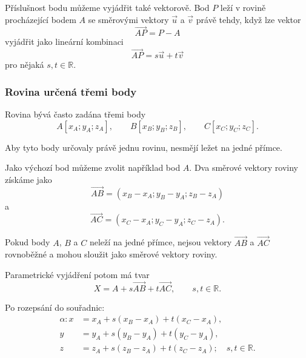 Příslušnost bodu můžeme vyjádřit také vektorově. Bod $P$ leží
v rovině procházející bodem $A$ se směrovými vektory $\vec{u}$
a $\vec{v}$ právě tehdy, když lze vektor
\[
    \overrightarrow{AP}=P-A
\]
vyjádřit jako lineární kombinaci
\[
    \overrightarrow{AP}=s\vec{u}+t\vec{v}
\]
pro nějaká $s,t\in\mathbb{R}$.


\subsubsection{Rovina určená třemi body}
\label{subsubsec:Plane_through_three_points}

Rovina bývá často zadána třemi body
\[
    A[x_A;y_A;z_A],
    \qquad
    B[x_B;y_B;z_B],
    \qquad
    C[x_C;y_C;z_C].
\]

Aby tyto body určovaly právě jednu rovinu, nesmějí ležet na jedné
přímce.

Jako výchozí bod můžeme zvolit například bod $A$. Dva směrové vektory
roviny získáme jako
\[
    \overrightarrow{AB}
    =
    (x_B-x_A;y_B-y_A;z_B-z_A)
\]
a
\[
    \overrightarrow{AC}
    =
    (x_C-x_A;y_C-y_A;z_C-z_A).
\]

Pokud body $A$, $B$ a $C$ neleží na jedné přímce, nejsou vektory
$\overrightarrow{AB}$ a $\overrightarrow{AC}$ rovnoběžné a mohou
sloužit jako směrové vektory roviny.

Parametrické vyjádření potom má tvar
\begin{equation}
    X=A+s\overrightarrow{AB}+t\overrightarrow{AC},
    \qquad
    s,t\in\mathbb{R}.
    \label{eq:Plane_through_three_points}
\end{equation}

Po rozepsání do souřadnic:
\begin{equation}
    \begin{aligned}
        \alpha: x&=x_A+s(x_B-x_A)+t(x_C-x_A),\\
        y&=y_A+s(y_B-y_A)+t(y_C-y_A),\\
        z&=z_A+s(z_B-z_A)+t(z_C-z_A);
        \quad s,t\in\mathbb{R}.
    \end{aligned}
    \label{eq:Plane_through_three_points_coordinates}
\end{equation}

